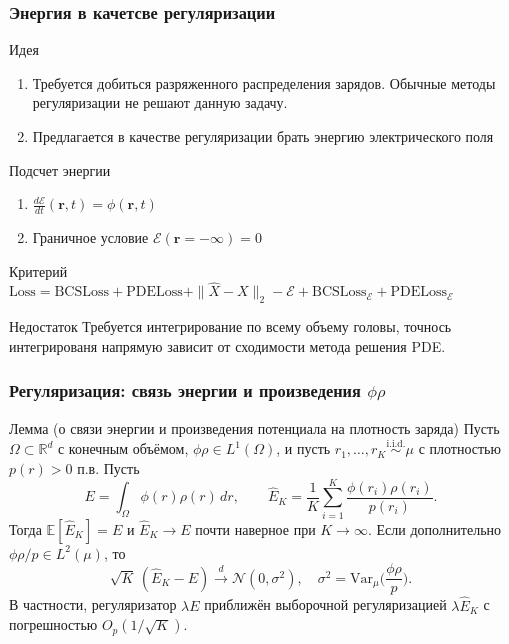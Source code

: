 \documentclass{beamer}
\begin{document}
\begin{frame}
\frametitle{Энергия в качетсве регуляризации}
\begin{block}{Идея}
    \begin{enumerate}
        \item Требуется добиться разряженного распределения зарядов. Обычные методы регуляризации не решают данную задачу.
        \item Предлагается в качестве регуляризации брать энергию электрического поля
    \end{enumerate}
\end{block}
\begin{block}{Подсчет энергии}
    \begin{enumerate}
        \item $\frac{d\mathcal{E}}{dt}(\mathbf{r}, t) = \phi(\mathbf{r}, t)$
        \item Граничное условие $\mathcal{E}(\mathbf{r} =-\infty) = 0$
    \end{enumerate}
\end{block}
\begin{block}{Критерий}
    $\text{Loss} = \text{BCSLoss} + \text{PDELoss} + \|\hat{X} - {X}\|_2 - \mathcal{E} + \text{BCSLoss}_\mathcal{E} + \text{PDELoss}_\mathcal{E}$
\end{block}
\begin{block}{Недостаток}
    Требуется интегрирование по всему объему головы, точнось интегрированя напрямую зависит от сходимости метода решения PDE.
\end{block}
\end{frame}

\begin{frame}
\frametitle{Регуляризация: связь энергии и произведения $\phi\rho$}
\begin{block}{Лемма (о связи энергии и произведения потенциала на плотность заряда)}
Пусть $\Omega\subset\mathbb{R}^d$ с конечным объёмом, $\phi\rho\in L^1(\Omega)$, и пусть
$r_1,\dots,r_K\stackrel{\text{i.i.d.}}{\sim}\mu$ с плотностью $p(r)>0$ п.в.
Пусть
\[
E=\int_\Omega \phi(r)\rho(r)\,dr,\qquad
\hat E_K=\frac{1}{K}\sum_{i=1}^K \frac{\phi(r_i)\rho(r_i)}{p(r_i)}.
\]
Тогда $\mathbb{E}[\hat E_K]=E$ и $\hat E_K\to E$ почти наверное при $K\to\infty$.
Если дополнительно $\phi\rho/p\in L^2(\mu)$, то
\[
\sqrt{K}\,(\hat E_K-E)\xrightarrow{d}\mathcal{N}(0,\sigma^2),\quad
\sigma^2=\mathrm{Var}_\mu\!\Big(\frac{\phi\rho}{p}\Big).
\]
В частности, регуляризатор $\lambda E$ приближён выборочной регуляризацией $\lambda\hat E_K$ с погрешностью $O_p(1/\sqrt{K})$.
\end{block}
\end{frame}
\end{document}
